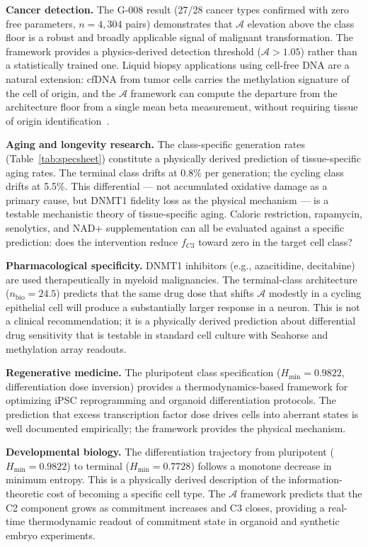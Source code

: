 \documentclass[12pt,a4paper]{article}
\newcommand{\Hmin}{H_{\min}}
\newcommand{\nbio}{n_{\mathrm{bio}}}
\newcommand{\Ascore}{\mathcal{A}}
\begin{document}
\textbf{Cancer detection.} The G-008 result (27/28 cancer types confirmed
with zero free parameters, $n = 4{,}304$ pairs) demonstrates that $\Ascore$
elevation above the class floor is a robust and broadly applicable signal of
malignant transformation. The framework provides a physics-derived detection
threshold ($\Ascore > 1.05$) rather than a statistically trained one. Liquid
biopsy applications using cell-free DNA are a natural extension: cfDNA from
tumor cells carries the methylation signature of the cell of origin, and
the $\Ascore$ framework can compute the departure from the architecture floor
from a single mean beta measurement, without requiring tissue of origin
identification~\cite{Grail2021}.

\textbf{Aging and longevity research.} The class-specific generation rates
(Table~\ref{tab:specsheet}) constitute a physically derived prediction of
tissue-specific aging rates. The terminal class drifts at 0.8\% per generation;
the cycling class drifts at 5.5\%. This differential --- not accumulated oxidative
damage as a primary cause, but DNMT1 fidelity loss as the physical mechanism
--- is a testable mechanistic theory of tissue-specific aging. Caloric
restriction, rapamycin, senolytics, and NAD+ supplementation can all be
evaluated against a specific prediction: does the intervention reduce
$f_{C3}$ toward zero in the target cell class?

\textbf{Pharmacological specificity.} DNMT1 inhibitors (e.g., azacitidine,
decitabine) are used therapeutically in myeloid malignancies. The terminal-class
architecture ($\nbio = 24.5$) predicts that the same drug dose that shifts
$\Ascore$ modestly in a cycling epithelial cell will produce a substantially
larger response in a neuron. This is not a clinical recommendation; it is
a physically derived prediction about differential drug sensitivity that
is testable in standard cell culture with Seahorse and methylation array readouts.

\textbf{Regenerative medicine.} The pluripotent class specification
($\Hmin = 0.9822$, differentiation dose inversion) provides a
thermodynamics-based framework for optimizing iPSC reprogramming and
organoid differentiation protocols. The prediction that excess transcription
factor dose drives cells into aberrant states is well documented empirically;
the framework provides the physical mechanism.

\textbf{Developmental biology.} The differentiation trajectory from
pluripotent ($\Hmin = 0.9822$) to terminal ($\Hmin = 0.7728$) follows a
monotone decrease in minimum entropy. This is a physically derived description
of the information-theoretic cost of becoming a specific cell type. The
$\Ascore$ framework predicts that the C2 component grows as commitment increases
and C3 closes, providing a real-time thermodynamic readout of commitment
state in organoid and synthetic embryo experiments.
\end{document}
